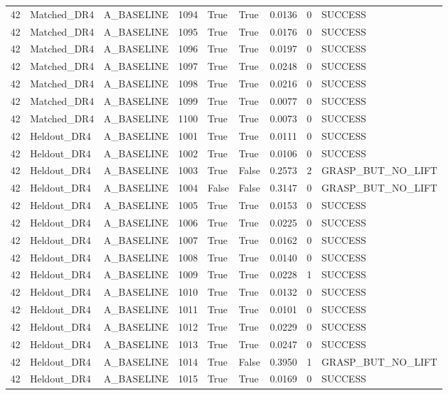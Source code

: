 \documentclass[11pt,a4paper,oneside]{book}
\begin{document}
\begin{longtable}{l l l l l l l l l}
42 & Matched\_DR4 & A\_BASELINE & 1094 & True & True & 0.0136 & 0 & SUCCESS \\
42 & Matched\_DR4 & A\_BASELINE & 1095 & True & True & 0.0176 & 0 & SUCCESS \\
42 & Matched\_DR4 & A\_BASELINE & 1096 & True & True & 0.0197 & 0 & SUCCESS \\
42 & Matched\_DR4 & A\_BASELINE & 1097 & True & True & 0.0248 & 0 & SUCCESS \\
42 & Matched\_DR4 & A\_BASELINE & 1098 & True & True & 0.0216 & 0 & SUCCESS \\
42 & Matched\_DR4 & A\_BASELINE & 1099 & True & True & 0.0077 & 0 & SUCCESS \\
42 & Matched\_DR4 & A\_BASELINE & 1100 & True & True & 0.0073 & 0 & SUCCESS \\
42 & Heldout\_DR4 & A\_BASELINE & 1001 & True & True & 0.0111 & 0 & SUCCESS \\
42 & Heldout\_DR4 & A\_BASELINE & 1002 & True & True & 0.0106 & 0 & SUCCESS \\
42 & Heldout\_DR4 & A\_BASELINE & 1003 & True & False & 0.2573 & 2 & GRASP\_BUT\_NO\_LIFT \\
42 & Heldout\_DR4 & A\_BASELINE & 1004 & False & False & 0.3147 & 0 & GRASP\_BUT\_NO\_LIFT \\
42 & Heldout\_DR4 & A\_BASELINE & 1005 & True & True & 0.0153 & 0 & SUCCESS \\
42 & Heldout\_DR4 & A\_BASELINE & 1006 & True & True & 0.0225 & 0 & SUCCESS \\
42 & Heldout\_DR4 & A\_BASELINE & 1007 & True & True & 0.0162 & 0 & SUCCESS \\
42 & Heldout\_DR4 & A\_BASELINE & 1008 & True & True & 0.0140 & 0 & SUCCESS \\
42 & Heldout\_DR4 & A\_BASELINE & 1009 & True & True & 0.0228 & 1 & SUCCESS \\
42 & Heldout\_DR4 & A\_BASELINE & 1010 & True & True & 0.0132 & 0 & SUCCESS \\
42 & Heldout\_DR4 & A\_BASELINE & 1011 & True & True & 0.0101 & 0 & SUCCESS \\
42 & Heldout\_DR4 & A\_BASELINE & 1012 & True & True & 0.0229 & 0 & SUCCESS \\
42 & Heldout\_DR4 & A\_BASELINE & 1013 & True & True & 0.0247 & 0 & SUCCESS \\
42 & Heldout\_DR4 & A\_BASELINE & 1014 & True & False & 0.3950 & 1 & GRASP\_BUT\_NO\_LIFT \\
42 & Heldout\_DR4 & A\_BASELINE & 1015 & True & True & 0.0169 & 0 & SUCCESS \\

\end{longtable}
\end{document}
